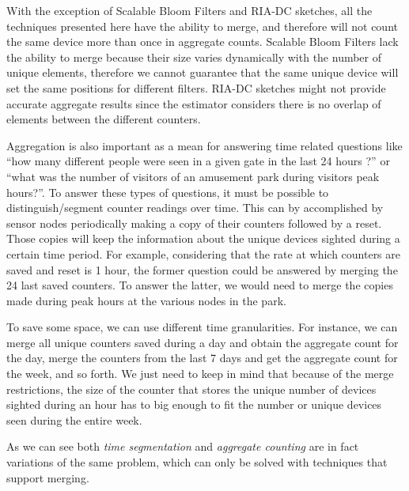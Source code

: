 With the exception of Scalable Bloom Filters and RIA-DC sketches, all
the techniques presented here have the ability to merge, and therefore
will not count the same device more than once in aggregate
counts. Scalable Bloom Filters lack the ability to merge because their
size varies dynamically with the number of unique elements, therefore
we cannot guarantee that the same unique device will set the same
positions for different filters. RIA-DC sketches might not provide
accurate aggregate results since the estimator considers there is no
overlap of elements between the different counters.

Aggregation is also important as a mean for answering time related
questions like ``how many different people were seen in a given gate
in the last 24 hours ?'' or ``what was the number of visitors of an
amusement park during visitors peak hours?''. To answer these types of
questions, it must be possible to distinguish/segment counter readings
over time. This can by accomplished by sensor nodes periodically
making a copy of their counters followed by a reset. Those copies will
keep the information about the unique devices sighted during a certain
time period. For example, considering that the rate at which counters
are saved and reset is 1 hour, the former question could be answered
by merging the 24 last saved counters. To answer the latter, we would
need to merge the copies made during peak hours at the various nodes
in the park.

To save some space, we can use different time granularities. For
instance, we can merge all unique counters saved during a day and
obtain the aggregate count for the day, merge the counters from the
last 7 days and get the aggregate count for the week, and so forth. We
just need to keep in mind that because of the merge restrictions, the
size of the counter that stores the unique number of devices sighted
during an hour has to big enough to fit the number or unique devices
seen during the entire week.

As we can see both \emph{time segmentation} and \emph{aggregate counting}
are in fact variations of the same problem, which can only be solved with
techniques that support merging. 

